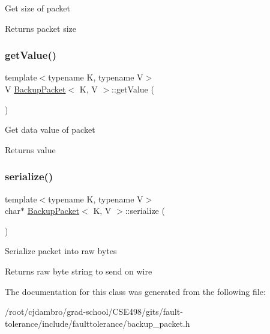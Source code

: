 Get size of packet

\begin{DoxyReturn}{Returns}
packet size 
\end{DoxyReturn}
\mbox{\label{classBackupPacket_a35e76302bebf4a0e6c871426844553fc}} 
\subsubsection{\texorpdfstring{get\+Value()}{getValue()}}
{\footnotesize\ttfamily template$<$typename K, typename V$>$ \\
V \mbox{\hyperlink{classBackupPacket}{Backup\+Packet}}$<$ K, V $>$\+::get\+Value (\begin{DoxyParamCaption}{ }\end{DoxyParamCaption})\hspace{0.3cm}{\ttfamily [inline]}}

Get data value of packet

\begin{DoxyReturn}{Returns}
value 
\end{DoxyReturn}
\mbox{\label{classBackupPacket_a626af7de776bd98ea1a322a4e9fd87bd}} 
\subsubsection{\texorpdfstring{serialize()}{serialize()}}
{\footnotesize\ttfamily template$<$typename K, typename V$>$ \\
char$\ast$ \mbox{\hyperlink{classBackupPacket}{Backup\+Packet}}$<$ K, V $>$\+::serialize (\begin{DoxyParamCaption}{ }\end{DoxyParamCaption})\hspace{0.3cm}{\ttfamily [inline]}}

Serialize packet into raw bytes

\begin{DoxyReturn}{Returns}
raw byte string to send on wire 
\end{DoxyReturn}


The documentation for this class was generated from the following file\+:\begin{DoxyCompactItemize}
\item 
/root/cjdambro/grad-\/school/\+C\+S\+E498/gits/fault-\/tolerance/include/faulttolerance/backup\+\_\+packet.\+h\end{DoxyCompactItemize}
